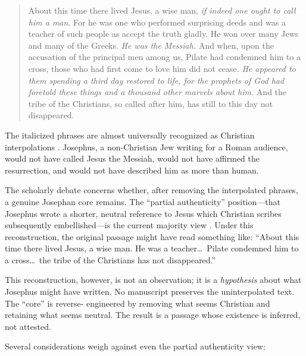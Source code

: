 \documentclass[12pt,oneside]{article}
\begin{document}
\begin{quote}
About this time there lived Jesus, a wise man, \textit{if indeed one
ought to call him a man}.  For he was one who performed surprising
deeds and was a teacher of such people as accept the truth gladly.  He
won over many Jews and many of the Greeks.  \textit{He was the
Messiah.}  And when, upon the accusation of the principal men among us,
Pilate had condemned him to a cross, those who had first come to love
him did not cease.  \textit{He appeared to them spending a third day
restored to life, for the prophets of God had foretold these things and
a thousand other marvels about him.}  And the tribe of the Christians,
so called after him, has still to this day not disappeared.
\end{quote}

\noindent
The italicized phrases are almost universally recognized as Christian
interpolations \citep{Meier1991,Ehrman2012}.  Josephus, a non-Christian
Jew writing for a Roman audience, would not have called Jesus the
Messiah, would not have affirmed the resurrection, and would not have
described him as more than human.

The scholarly debate concerns whether, after removing the interpolated
phrases, a genuine Josephan core remains.  The ``partial authenticity''
position---that Josephus wrote a shorter, neutral reference to Jesus
which Christian scribes subsequently embellished---is the current
majority view \citep{Meier1991}.  Under this reconstruction, the
original passage might have read something like: ``About this time there
lived Jesus, a wise man.  He was a teacher\ldots\ Pilate condemned him
to a cross\ldots\ the tribe of the Christians has not disappeared.''

This reconstruction, however, is not an observation; it is a
\textit{hypothesis} about what Josephus might have written.  No
manuscript preserves the uninterpolated text.  The ``core'' is reverse-
engineered by removing what seems Christian and retaining what seems
neutral.  The result is a passage whose existence is inferred, not
attested.

Several considerations weigh against even the partial authenticity
view:
\end{document}
